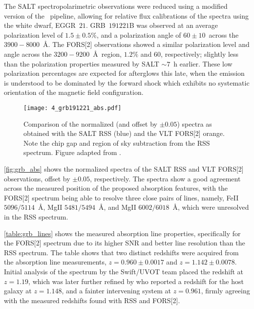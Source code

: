 The \gls{SALT} spectropolarimetric observations were reduced using a modified version of the \polsalt\ pipeline, allowing for relative flux calibrations of the spectra using the white dwarf, EGGR~$21$.
GRB~$191221$B was observed at an average polarization level of $1.5 \pm 0.5\%$, and a polarization angle of $60 \pm 10$\degree\ across the $3900 - 8000$~\AA.
The \gls{FORS}[2] observations showed a similar polarization level and angle across the $3200 - 9200$~\AA\ region, $1.2\%$ and $60$\degree, respectively; slightly less than the polarization properties measured by \gls{SALT} $\sim 7$~h earlier.
These low polarization percentages are expected for afterglows this late, when the emission is understood to be dominated by the forward shock which exhibits no systematic orientation of the magnetic field configuration.

\begin{figure}[t]
    \centering
    \texttt{[image: 4\_grb191221\_abs.pdf]}
    \caption{Comparison of the normalized (and offset by $\pm 0.05$) spectra as obtained with the \gls{SALT} \gls{RSS} (blue) and the \gls{VLT} \gls{FORS}[2] orange. Note the chip gap and region of sky subtraction from the \gls{RSS} spectrum. Figure adapted from \citep{Buckley191221B}.}
    \label{fig:grb_abs}
\end{figure}

\autoref{fig:grb_abs} shows the normalized spectra of the \gls{SALT} \gls{RSS} and \gls{VLT} \gls{FORS}[2] observations, offset by $\pm 0.05$, respectively.
The spectra show a good agreement across the measured position of the proposed absorption features, with the \gls{FORS}[2] spectrum being able to resolve three close pairs of lines, namely, {Fe}{II} $5096/5114$~\AA, {Mg}{II} $5481/5494$~\AA, and {Mg}{II} $6002/6018$~\AA, which were unresolved in the \gls{RSS} spectrum.



\autoref{table:grb_lines} shows the measured absorption line properties, specifically for the \gls{FORS}[2] spectrum due to its higher \gls{SNR} and better line resolution than the \gls{RSS} spectrum.
The table shows that two distinct redshifts were acquired from the absorption line measurements, $z = 0.960 \pm 0.0017$ and $z = 1.142 \pm 0.0078$.
Initial analysis of the spectrum by the \gls{Swift}/\gls{UVOT} team \citep{Kuin2019} placed the redshift at $z = 1.19$, which was later further refined by \citet{Vielfaure2019} who reported a redshift for the host galaxy at $z = 1.148$, and a fainter intervening system at $z = 0.961$, firmly agreeing with the measured redshifts found with \gls{RSS} and \gls{FORS}[2].

